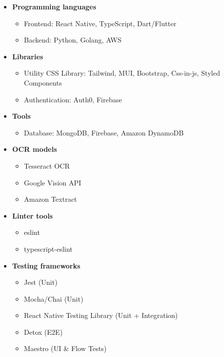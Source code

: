 \documentclass{article}
\begin{document}
\begin{itemize}
    \item \textbf{Programming languages}
    \begin{itemize}
        \item Frontend: React Native, TypeScript, Dart/Flutter
        \item Backend: Python, Golang, AWS
    \end{itemize}
    
    \item \textbf{Libraries}
    \begin{itemize}
        \item Utility CSS Library: Tailwind, MUI, Bootstrap, Css-in-js, Styled
        Components
        \item Authentication: Auth0, Firebase
    \end{itemize}
    
    \item \textbf{Tools}
    \begin{itemize}
        \item Database: MongoDB, Firebase, Amazon DynamoDB
    \end{itemize}
    
    \item \textbf{OCR models}
    \begin{itemize}
        \item Tesseract OCR
        \item Google Vision API
        \item Amazon Textract
    \end{itemize}
    
    \item \textbf{Linter tools}
    \begin{itemize}
        \item eslint
        \item typescript-eslint
    \end{itemize}
    
    \item \textbf{Testing frameworks}
    \begin{itemize}
        \item Jest (Unit)
        \item Mocha/Chai (Unit)
        \item React Native Testing Library (Unit + Integration)
        \item Detox (E2E)
        \item Maestro (UI \& Flow Tests)
    \end{itemize}
    

\end{itemize}
\end{document}
